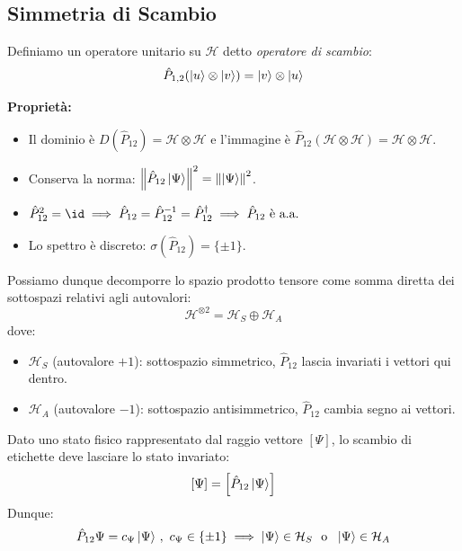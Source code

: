 \subsection{Simmetria di Scambio}
Definiamo un operatore unitario su \(\mathcal{H}\) detto \textit{operatore di scambio}:
\begin{equation}
    \hat{P}_{1,2} ( \ket{u}\otimes\ket{v} ) = \ket{v}\otimes\ket{u}
\end{equation}

\textbf{Proprietà:}
\begin{itemize}
    \item Il dominio è \( D(\hat{P}_{12}) = \mathcal{H} \otimes \mathcal{H} \) e l'immagine è \( \hat{P}_{12}(\mathcal{H} \otimes \mathcal{H}) = \mathcal{H} \otimes \mathcal{H} \).
    \item Conserva la norma: \( \norm{\hat{P}_{12}\ket{\Psi}}^2 = \norm{\ket{\Psi}}^2 \).
    \item 
    \(
    \hat{P}_{12}^2 = \id \implies \hat{P}_{12} = \hat{P}_{12}^{-1} = \hat{P}_{12}^\dagger \implies \hat{P}_{12} \text{ è a.a.}
    \)
    \item Lo spettro è discreto: \( \sigma(\hat{P}_{12}) = \{ \pm 1 \} \).
\end{itemize}

Possiamo dunque decomporre lo spazio prodotto tensore come somma diretta dei sottospazi relativi agli autovalori:
\[
\mathcal{H}^{\otimes 2} = \mathcal{H}_S \oplus \mathcal{H}_A
\]
dove:
\begin{itemize}
    \item \( \mathcal{H}_S \) (autovalore \( +1 \)): sottospazio simmetrico, \( \hat{P}_{12} \) lascia invariati i vettori qui dentro.
    \item \( \mathcal{H}_A \) (autovalore \( -1 \)): sottospazio antisimmetrico, \( \hat{P}_{12} \) cambia segno ai vettori.
\end{itemize}

\begin{postulato9}
    Dato uno stato fisico rappresentato dal raggio vettore \(\left[ \Psi \right]\), lo scambio di etichette deve lasciare lo stato invariato:
    \begin{equation}
        \left[ \Psi \right]= \left[ \hat{P}_{12} \ket{\Psi}\right]
    \end{equation}
    Dunque: \[
        \hat{P}_{12} \Psi= c_\Psi\ket{\Psi}\,, \ c_\Psi \in \left\{ \pm 1  \right\} \implies \ket{\Psi} \in \mathcal{H}_S \ \text{ o } \ \ket{\Psi} \in \mathcal{H}_A
    \]
\end{postulato9}

